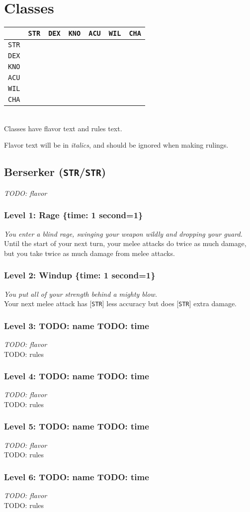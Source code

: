 \documentclass[12pt]{article}
\newcommand{\STR}{\texttt{STR}}
\newcommand{\DEX}{\texttt{DEX}}
\newcommand{\KNO}{\texttt{KNO}}
\newcommand{\ACU}{\texttt{ACU}}
\newcommand{\WIL}{\texttt{WIL}}
\newcommand{\CHA}{\texttt{CHA}}
\newcommand{\TIME}[1]{\{time: #1 second\if1=#1{}\else{s}\fi\}}
\newcommand{\Class}[3]{\pagebreak\subsection{#1 (#2)}\label{#1}\textit{#3}}
\newcommand{\Skill}[5]{\subsubsection{Level #1: #2 #3}\textit{#4}\\[1mm]#5}
\begin{document}
\pagebreak
\section{Classes}

\begin{tabularx}{\textwidth}{c|CCCCCC}
& \STR & \DEX & \KNO & \ACU & \WIL & \CHA \\\hline
\STR &  &  &  &  &  &  \\
\DEX &  &  &  &  &  &  \\
\KNO &  &  &  &  &  &  \\
\ACU &  &  &  &  &  &   \\
\WIL &  &  &  &  &  &  \\
\CHA &  &  &  &  &  &  \\
\end{tabularx}
\\[5mm]
Classes have flavor text and rules text.

Flavor text will be in \textit{italics}, and should be ignored when making rulings.

%

\Class{Berserker}{\STR/\STR}
{TODO: flavor}

\Skill{1}{Rage}{\TIME{1}}
{You enter a blind rage, swinging your weapon wildly and dropping your guard.}
{Until the start of your next turn, your melee attacks do twice as much damage, but you take twice as much damage from melee attacks.}

\Skill{2}{Windup}{\TIME{1}}
{You put all of your strength behind a mighty blow.}
{Your next melee attack has [\STR] less accuracy but does [\STR] extra damage.}

\Skill{3}{TODO: name}{TODO: time}
{TODO: flavor}
{TODO: rules}

\Skill{4}{TODO: name}{TODO: time}
{TODO: flavor}
{TODO: rules}

\Skill{5}{TODO: name}{TODO: time}
{TODO: flavor}
{TODO: rules}

\Skill{6}{TODO: name}{TODO: time}
{TODO: flavor}
{TODO: rules}
\end{document}
